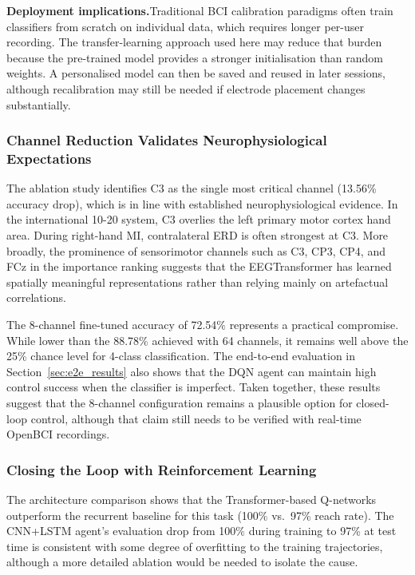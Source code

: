 \documentclass[12pt, a4paper]{article}
\begin{document}
\textbf{Deployment implications.}\quad Traditional BCI calibration paradigms often train classifiers from scratch on individual data, which requires longer per-user recording. The transfer-learning approach used here may reduce that burden because the pre-trained model provides a stronger initialisation than random weights. A personalised model can then be saved and reused in later sessions, although recalibration may still be needed if electrode placement changes substantially.

\subsubsection{Channel Reduction Validates Neurophysiological Expectations}

The ablation study identifies C3 as the single most critical channel (13.56\% accuracy drop), which is in line with established neurophysiological evidence. In the international 10-20 system, C3 overlies the left primary motor cortex hand area. During right-hand MI, contralateral ERD is often strongest at C3. More broadly, the prominence of sensorimotor channels such as C3, CP3, CP4, and FCz in the importance ranking suggests that the EEGTransformer has learned spatially meaningful representations rather than relying mainly on artefactual correlations.

The 8-channel fine-tuned accuracy of 72.54\% represents a practical compromise. While lower than the 88.78\% achieved with 64 channels, it remains well above the 25\% chance level for 4-class classification. The end-to-end evaluation in Section~\ref{sec:e2e_results} also shows that the DQN agent can maintain high control success when the classifier is imperfect. Taken together, these results suggest that the 8-channel configuration remains a plausible option for closed-loop control, although that claim still needs to be verified with real-time OpenBCI recordings.

\subsubsection{Closing the Loop with Reinforcement Learning}

The architecture comparison shows that the Transformer-based Q-networks outperform the recurrent baseline for this task (100\% vs.~97\% reach rate). The CNN+LSTM agent's evaluation drop from 100\% during training to 97\% at test time is consistent with some degree of overfitting to the training trajectories, although a more detailed ablation would be needed to isolate the cause.
\end{document}
